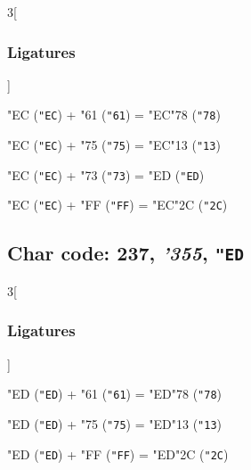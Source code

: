 \documentclass{article}
\newlength{\maxcharwidth}
\begin{document}
\begin{multicols}{3}[\subsubsection{Ligatures}]

{\testfont\char"EC\noboundary} ({\tt"EC}) + {\testfont\char"61\noboundary} ({\tt"61}) = {\testfont\char"EC\noboundary}{\testfont\char"78\noboundary} ({\tt"78}) 

{\testfont\char"EC\noboundary} ({\tt"EC}) + {\testfont\char"75\noboundary} ({\tt"75}) = {\testfont\char"EC\noboundary}{\testfont\char"13\noboundary} ({\tt"13}) 

{\testfont\char"EC\noboundary} ({\tt"EC}) + {\testfont\char"73\noboundary} ({\tt"73}) = {\testfont\char"ED\noboundary} ({\tt"ED}) 

{\testfont\char"EC\noboundary} ({\tt"EC}) + {\testfont\char"FF\noboundary} ({\tt"FF}) = {\testfont\char"EC\noboundary}{\testfont\char"2C\noboundary} ({\tt"2C}) 

\end{multicols}

\subsection{Char code: 237, {\it'355}, {\tt"ED}}
\label{char_237}


\begin{multicols}{3}[\subsubsection{Ligatures}]

{\testfont\char"ED\noboundary} ({\tt"ED}) + {\testfont\char"61\noboundary} ({\tt"61}) = {\testfont\char"ED\noboundary}{\testfont\char"78\noboundary} ({\tt"78}) 

{\testfont\char"ED\noboundary} ({\tt"ED}) + {\testfont\char"75\noboundary} ({\tt"75}) = {\testfont\char"ED\noboundary}{\testfont\char"13\noboundary} ({\tt"13}) 

{\testfont\char"ED\noboundary} ({\tt"ED}) + {\testfont\char"FF\noboundary} ({\tt"FF}) = {\testfont\char"ED\noboundary}{\testfont\char"2C\noboundary} ({\tt"2C}) 

\end{multicols}
\end{document}
